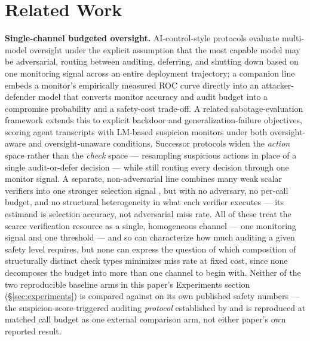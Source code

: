 \documentclass[11pt]{article}
\begin{document}
\section{Related Work}

\textbf{Single-channel budgeted oversight.} AI-control-style protocols \citep{AIControl2024} evaluate multi-model oversight under the explicit assumption that the most capable model may be adversarial, routing between auditing, deferring, and shutting down based on one monitoring signal across an entire deployment trajectory; a companion line \citep{ControlTax2024} embeds a monitor's empirically measured ROC curve directly into an attacker-defender model that converts monitor accuracy and audit budget into a compromise probability and a safety-cost trade-off. A related sabotage-evaluation framework \citep{CtrlAltDeceit2024} extends this to explicit backdoor and generalization-failure objectives, scoring agent transcripts with LM-based suspicion monitors under both oversight-aware and oversight-unaware conditions. Successor protocols widen the \emph{action} space rather than the \emph{check} space --- resampling suspicious actions in place of a single audit-or-defer decision \citep{CtrlZ2025} --- while still routing every decision through one monitor signal. A separate, non-adversarial line combines many weak scalar verifiers into one stronger selection signal \citep{Weaver2025}, but with no adversary, no per-call budget, and no structural heterogeneity in what each verifier executes --- its estimand is selection accuracy, not adversarial miss rate. All of these treat the scarce verification resource as a single, homogeneous channel --- one monitoring signal and one threshold --- and so can characterize how much auditing a given safety level requires, but none can express the question of which composition of structurally distinct check types minimizes miss rate at fixed cost, since none decomposes the budget into more than one channel to begin with. Neither of the two reproducible baseline arms in this paper's Experiments section (\S\ref{sec:experiments}) is compared against on its own published safety numbers --- the suspicion-score-triggered auditing \emph{protocol} established by \citet{AIControl2024} and \citet{ControlTax2024} is reproduced at matched call budget as one external comparison arm, not either paper's own reported result.
\end{document}
